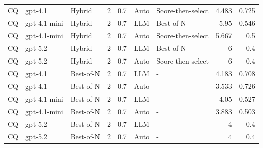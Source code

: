 \begin{table}[t]
{\begin{tabular}{lllrlllrr}
CQ & gpt-4.1 & Hybrid & 2 & 0.7 & Auto & Score-then-select & 4.483 & 0.725 \\
CQ & gpt-4.1-mini & Hybrid & 2 & 0.7 & LLM & Best-of-N & 5.95 & 0.546 \\
CQ & gpt-4.1-mini & Hybrid & 2 & 0.7 & Auto & Score-then-select & 5.667 & 0.5 \\
CQ & gpt-5.2 & Hybrid & 2 & 0.7 & LLM & Best-of-N & 6 & 0.4 \\
CQ & gpt-5.2 & Hybrid & 2 & 0.7 & Auto & Score-then-select & 6 & 0.4 \\
CQ & gpt-4.1 & Best-of-N & 2 & 0.7 & LLM & - & 4.183 & 0.708 \\
CQ & gpt-4.1 & Best-of-N & 2 & 0.7 & Auto & - & 3.533 & 0.726 \\
CQ & gpt-4.1-mini & Best-of-N & 2 & 0.7 & LLM & - & 4.05 & 0.527 \\
CQ & gpt-4.1-mini & Best-of-N & 2 & 0.7 & Auto & - & 3.883 & 0.503 \\
CQ & gpt-5.2 & Best-of-N & 2 & 0.7 & LLM & - & 4 & 0.4 \\
CQ & gpt-5.2 & Best-of-N & 2 & 0.7 & Auto & - & 4 & 0.4 \\
\bottomrule
\end{tabular}
}
\end{table}
